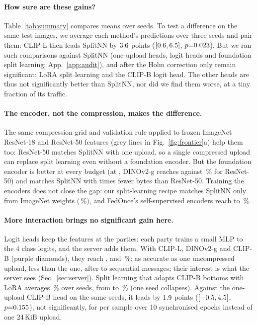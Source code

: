 \paragraph{How sure are these gains?}
Table~\ref{tab:summary} compares means over seeds. To test a difference on the same test images, we average each method's predictions over three seeds and pair them: CLIP-L then leads SplitNN by $3.6$ points ($[0.6,6.5]$, $p{=}0.023$). But we ran \holmN{} such comparisons against SplitNN (one-upload heads, logit heads and foundation split learning; App.~\ref{app:audit}), and after the Holm correction only \holmSurvive{} remain significant: LoRA split learning and the CLIP-B logit head. The other heads are thus not significantly better than SplitNN, nor did we find them worse, at a tiny fraction of its traffic.

\paragraph{The encoder, not the compression, makes the difference.}
The same compression grid and validation rule applied to frozen ImageNet ResNet-18 and ResNet-50 features (grey lines in Fig.~\ref{fig:frontier}a) help them too: ResNet-50 matches SplitNN with one \frVbReachSplitNNResnetBytes{} upload, so a single compressed upload can replace split learning even without a foundation encoder. But the foundation encoder is better at every budget (at \frVbBestNonFoundBytes, DINOv2-g reaches \frVbPcaGTwoKiB{} against \frVbResnetTwoKiB\,\% for ResNet-50) and matches SplitNN with \frVbReachSplitNNRatio{} times fewer bytes than ResNet-50. Training the encoders does not close the gap: our split-learning recipe matches SplitNN only from ImageNet weights (\splitPTAcc\,\%), and FedOnce's self-supervised encoders reach \natAcc{} to \sslAllAcc\,\%.

\paragraph{More interaction brings no significant gain here.}
Logit heads keep the features at the parties: each party trains a small MLP to the 4 class logits, and the server adds them. With CLIP-L, DINOv2-g and CLIP-B (purple diamonds), they reach \lgClipAcc, \lgGAcc{} and \lgClipBAcc\,\%: as accurate as one uncompressed upload, less than the \selTwokBytes{} one, after \frVbLogitRoundsMin{} to \frVbLogitRoundsMax{} sequential messages; their interest is what the server sees (Sec.~\ref{sec:server}). Split learning that adapts CLIP-B bottoms with LoRA averages \vbSplitLoraAcc\,\% over \vbSplitLoraN{} seeds, from \seedLoraMin{} to \seedLoraMax\,\% (one seed collapses). Against the one-upload CLIP-B head on the same seeds, it leads by $1.9$ points ($[-0.5,4.5]$, $p{=}0.155$), not significantly, for \vbSplitLoraUp{} per sample over 10 synchronised epochs instead of one 24\,KiB upload.

